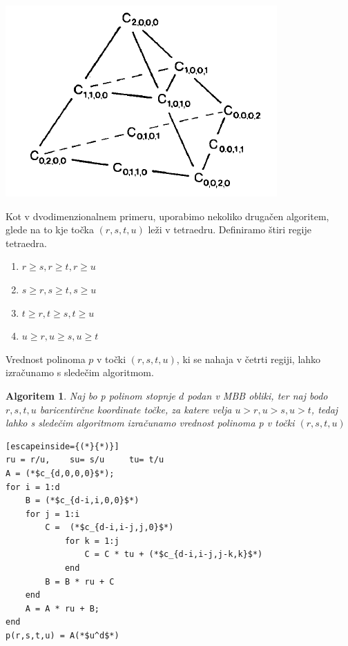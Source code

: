 \documentclass{article}
\newtheorem{algoritm}{Algoritem}[section]
\begin{document}
\begin{center}
\includegraphics[width=.7\linewidth]{tetraeder.PNG}
\end{center}

Kot v dvodimenzionalnem primeru, uporabimo nekoliko drugačen algoritem, glede na to kje točka $(r, s, t, u)$ leži v tetraedru.
Definiramo štiri regije tetraedra.

\begin{enumerate}
\item $r\geq s, r\geq t, r\geq u$
\item $s\geq r, s\geq t, s\geq u$
\item $t\geq r, t\geq s, t\geq u$
\item $u\geq r,u\geq s, u\geq t$
\end{enumerate}


Vrednost polinoma $p$ v točki $(r,s,t,u)$, ki se nahaja v četrti regiji, lahko izračunamo s sledečim algoritmom.

\begin{algoritm}
Naj bo p polinom stopnje $d$ podan v MBB obliki, ter naj bodo $ r,s,t,u$ baricentirčne koordinate točke, za katere velja $u > r,u > s, u>t$, tedaj lahko s sledečim algoritmom izračunamo vrednost polinoma p v točki $(r,s,t,u)$

\begin{lstlisting}[escapeinside={(*}{*)}]
ru = r/u,	 su= s/u	 tu= t/u
A = (*$c_{d,0,0,0}$*);
for i = 1:d
    B = (*$c_{d-i,i,0,0}$*)
    for j = 1:i
        C =  (*$c_{d-i,i-j,j,0}$*)
            for k = 1:j
                C = C * tu + (*$c_{d-i,i-j,j-k,k}$*)
            end
        B = B * ru + C
    end
    A = A * ru + B;
end
p(r,s,t,u) = A(*$u^d$*)
\end{lstlisting}
\end{algoritm}
\end{document}
